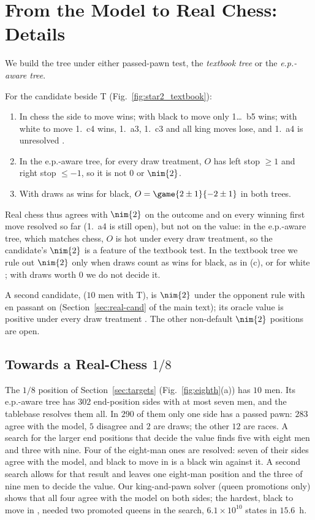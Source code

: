 \section{From the Model to Real Chess: Details}\label{S-real}
We build the tree under either passed-pawn test, the \emph{textbook tree} or the \emph{e.p.-aware tree}.

\begin{theorem}
For the candidate  beside T (Fig.~\ref{fig:star2_textbook}):
\begin{enumerate}
\item[(a)] In chess the side to move wins; with black to move only 1\ldots~b5 wins; with white to
  move 1.~c4 wins, 1.~a3, 1.~c3 and all king moves lose, and 1.~a4 is unresolved .
\item[(b)] In the e.p.-aware tree, for every draw treatment, $O$ has left stop $\ge1$ and right stop $\le-1$, so
  it is not $0$ or $\nim{2}$.
\item[(c)] With draws as wins for black, $O=\game{2\pm1}{-2\pm1}$ in both trees.
\end{enumerate}
\end{theorem}

Real chess thus agrees with $\nim{2}$ on the outcome and on every winning first move resolved so far
(1.~a4 is still open), but not on the value: in the e.p.-aware tree, which matches chess, $O$ is hot under every draw treatment, so
the candidate's $\nim{2}$ is a feature of the textbook test. In the textbook tree we rule out
$\nim{2}$ only when draws count as wins for black, as in (c), or for white ; with draws worth $0$ we do
not decide it.

A second candidate,  ($10$ men with T), is $\nim{2}$ under the opponent
rule with en passant on (Section~\ref{sec:real-cand} of the main text); its oracle value is positive under every draw treatment
. The other non-default $\nim{2}$ positions are open.

\subsection{Towards a Real-Chess \texorpdfstring{$1/8$}{1/8}}

The $1/8$ position of Section~\ref{sec:targets} (Fig.~\ref{fig:eighth}(a)) has $10$ men. Its e.p.-aware tree
has $302$ end-position sides with at most seven men, and the tablebase resolves them all. In $290$ of them
only one side has a passed pawn: $283$ agree with the model, $5$ disagree and $2$ are draws; the other $12$ are
races. A search for the larger end positions that decide the value finds five with eight men and three with
nine. Four of the eight-man ones are resolved: seven of their sides agree with the model, and black to move in
 is a black win against it. A second search allows for that result and leaves one
eight-man position and the three of nine men to decide the value. Our king-and-pawn solver (queen promotions
only) shows that all four agree with the model on both sides; the hardest, black to move in
, needed two promoted queens in the search, $6.1\times10^{10}$ states in $15.6$~h.

